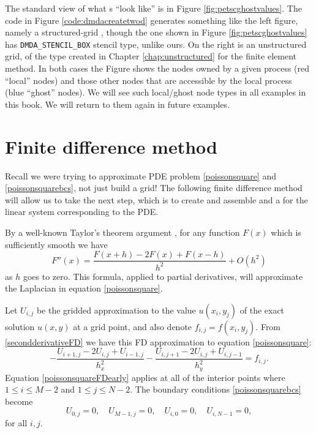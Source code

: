 The standard \PETSc view of what \pDM s ``look like'' is in Figure \ref{fig:petscghostvalues}.  The code in Figure \ref{code:dmdacreatetwod} generates something like the left figure, namely a structured-grid \pDM, though the one shown in Figure \ref{fig:petscghostvalues} has \texttt{DMDA\_STENCIL\_BOX} stencil type, unlike ours.  On the right is an unstructured grid, of the type created in Chapter \ref{chap:unstructured} for the finite element method.  In both cases the Figure shows the nodes owned by a given process (red ``local'' nodes) and those other nodes that are accessible by the local process (blue ``ghost'' nodes).  We will see such local/ghost node types in all examples in this book.  We will return to them again in future examples.


\section{Finite difference method}

Recall we were trying to approximate PDE problem \eqref{poissonsquare} and \eqref{poissonsquarebcs}, not just build a grid!  The following finite difference method will allow us to take the next \PETSc step, which is to create and assemble \pVecs and a \pMat for the linear system corresponding to the PDE.

By a well-known Taylor's theorem argument \citep{MortonMayers}, for any function $F(x)$ which is sufficiently smooth we have
\begin{equation}
   F''(x) = \frac{F(x+h) - 2 F(x) + F(x-h)}{h^2} + O(h^2)  \label{secondderivativeFD}
\end{equation}
as $h$ goes to zero.  This formula, applied to partial derivatives, will approximate the Laplacian in equation \eqref{poissonsquare}.

Let $U_{i,j}$ be the gridded approximation to the value $u(x_i,y_j)$ of the exact solution $u(x,y)$ at a grid point, and also denote $f_{i,j} = f(x_i,y_j)$.  From \eqref{secondderivativeFD} we have this FD approximation to equation \eqref{poissonsquare}:
\begin{equation}
- \frac{U_{i+1,j} - 2 U_{i,j} + U_{i-1,j}}{h_x^2} - \frac{U_{i,j+1} - 2 U_{i,j} + U_{i,j-1}}{h_y^2} = f_{i,j}. \label{poissonsquareFDearly}
\end{equation}
Equation \eqref{poissonsquareFDearly} applies at all of the interior points where $1 \le i \le M-2$ and $1 \le j \le N-2$.  The boundary conditions \eqref{poissonsquarebcs} become
\begin{equation}
U_{0,j} = 0, \quad U_{M-1,j} = 0, \quad U_{i,0} = 0, \quad U_{i,N-1} = 0, \label{poissonsquareFDbcs}
\end{equation}
for all $i,j$.

